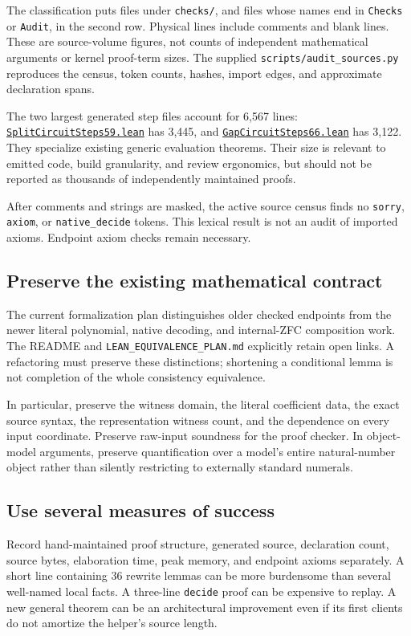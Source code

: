 \documentclass[11pt,letterpaper]{article}
\newcommand{\code}[1]{\nolinkurl{#1}}
\newcommand{\src}[2]{\href{https://github.com/VladimirReshetnikov/ProveIt/blob/60e9c5d620c6c387d932876cfa2d9376f64ea56c/Computability/DiophantineConsistency/Lean/DiophantineConsistency/#1.lean}{\code{#1.lean}}#2}
\begin{document}
The classification puts files under \code{checks/}, and files whose names end
in \code{Checks} or \code{Audit}, in the second row. Physical lines include
comments and blank lines. These are source-volume figures, not counts of
independent mathematical arguments or kernel proof-term sizes. The supplied
\code{scripts/audit_sources.py} reproduces the census, token counts, hashes,
import edges, and approximate declaration spans.

The two largest generated step files account for 6,567 lines:
\src{SplitCircuitSteps59}{ has 3,445, and }
\src{GapCircuitSteps66}{ has 3,122.}
They specialize existing generic evaluation theorems. Their size is relevant
to emitted code, build granularity, and review ergonomics, but should not be
reported as thousands of independently maintained proofs.

After comments and strings are masked, the active source census finds no
\code{sorry}, \code{axiom}, or \code{native_decide} tokens. This lexical result
is not an audit of imported axioms. Endpoint axiom checks remain necessary.

\subsection{Preserve the existing mathematical contract}

The current formalization plan distinguishes older checked endpoints from
the newer literal polynomial, native decoding, and internal-ZFC composition
work. The README and \code{LEAN_EQUIVALENCE_PLAN.md} explicitly retain open
links. A refactoring must preserve these distinctions; shortening a conditional
lemma is not completion of the whole consistency equivalence.\cite{readme,plan}

In particular, preserve the witness domain, the literal coefficient data,
the exact source syntax, the representation witness count, and the dependence
on every input coordinate. Preserve raw-input soundness for the proof checker.
In object-model arguments, preserve quantification over a model's entire
natural-number object rather than silently restricting to externally standard
numerals.

\subsection{Use several measures of success}

Record hand-maintained proof structure, generated source, declaration count,
source bytes, elaboration time, peak memory, and endpoint axioms separately.
A short line containing 36 rewrite lemmas can be more burdensome than several
well-named local facts. A three-line \code{decide} proof can be expensive to
replay. A new general theorem can be an architectural improvement even if its
first clients do not amortize the helper's source length.
\end{document}
